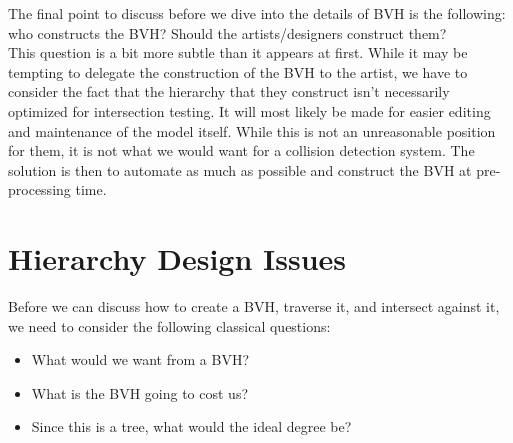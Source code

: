   The final point to discuss before we dive into the details of BVH is the
  following: who constructs the BVH? Should the artists/designers construct
  them?\\
  This question is a bit more subtle than it appears at first. While it may be
  tempting to delegate the construction of the BVH to the artist, we have to
  consider the fact that the hierarchy that they construct isn't necessarily
  optimized for intersection testing. It will most likely be made for easier
  editing and maintenance of the model itself. While this is not an unreasonable
  position for them, it is not what we would want for a collision detection
  system. The solution is then to automate as much as possible and construct the
  BVH at pre-processing time.

  \section{Hierarchy Design Issues}
    Before we can discuss how to create a BVH, traverse it, and intersect
    against it, we need to consider the following classical questions:
    \begin{itemize}
      \item What would we want from a BVH?
      \item What is the BVH going to cost us?
      \item Since this is a tree, what would the ideal degree be?
    \end{itemize}
